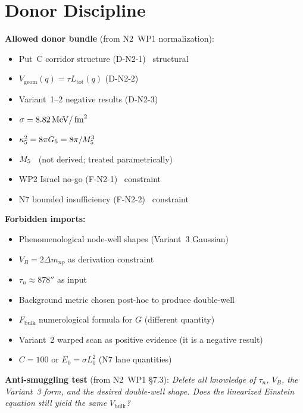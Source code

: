 \section{Donor Discipline}
\label{sec:P2N2:donors}

\textbf{Allowed donor bundle} (from N2~WP1 normalization):
\begin{itemize}
    \item Put~C corridor structure (D-N2-1) \tagDef\ structural
    \item $V_{\mathrm{geom}}(q) = \tau L_{\mathrm{tot}}(q)$ (D-N2-2) \tagDc
    \item Variant~1--2 negative results (D-N2-3) \tagDc
    \item $\sigma = 8.82\,\mathrm{MeV}/\,\mathrm{fm}^2$ \tagDc
    \item $\kappa_5^2 = 8\pi G_5 = 8\pi/M_5^3$ \tagDef
    \item $M_5$ \tagP\ (not derived; treated parametrically)
    \item WP2 Israel no-go (F-N2-1) \tagDc\ constraint
    \item N7 bounded insufficiency (F-N2-2) \tagDc\ constraint
\end{itemize}

\textbf{Forbidden imports:}
\begin{itemize}
    \item Phenomenological node-well shapes (Variant~3 Gaussian)
    \item $V_B = 2\Delta m_{np}$ as derivation constraint
    \item $\tau_n \approx 878\second$ as input
    \item Background metric chosen post-hoc to produce double-well
    \item $F_{\mathrm{bulk}}$ numerological formula for $G$ (different quantity)
    \item Variant~2 warped scan as positive evidence (it is a negative result)
    \item $C = 100$ or $E_0 = \sigma L_0^2$ (N7 lane quantities)
\end{itemize}

\textbf{Anti-smuggling test} (from N2~WP1 \S7.3):
\emph{Delete all knowledge of $\tau_n$, $V_B$, the Variant~3 form,
and the desired double-well shape. Does the linearized Einstein
equation still yield the same $V_{\mathrm{bulk}}$?}

